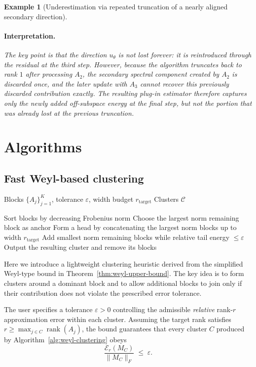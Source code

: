 \documentclass[10pt]{article} %
\newtheorem{example}{Example}
\begin{document}
\begin{example}[Underestimation via repeated truncation of a nearly aligned secondary direction]
\paragraph{Interpretation.}
The key point is that the direction $u_\theta$ is not lost forever: it is reintroduced through the residual
at the third step. However, because the algorithm truncates back to rank $1$ after processing $A_2$,
the secondary spectral component created by $A_2$ is discarded once, and the later update with $A_3$
cannot recover this previously discarded contribution exactly. The resulting plug-in estimator therefore
captures only the \emph{newly added} off-subspace energy at the final step, but not the portion that was
already lost at the previous truncation.
\end{example}


\section{Algorithms}

\subsection{Fast Weyl-based clustering}
\label{appendix:algo1}

\begin{algorithm}[t]
\caption{Weyl-based max-norm clustering}
\label{alg:weyl-clustering}
\begin{algorithmic}[1]
\REQUIRE Blocks $\{A_j\}_{j=1}^K$, tolerance $\varepsilon$, width budget $r_{\mathrm{target}}$
\ENSURE Clusters $\mathcal{C}$

\STATE Sort blocks by decreasing Frobenius norm
    \STATE Choose the largest norm remaining block as anchor
    \STATE Form a head by concatenating the largest norm blocks up to width $r_{\mathrm{target}}$
    \STATE Add smallest norm remaining blocks while relative tail energy $\le \varepsilon$
    \STATE Output the resulting cluster and remove its blocks
\ENDWHILE
\end{algorithmic}
\end{algorithm}

Here we introduce a lightweight clustering heuristic derived from the
simplified Weyl-type bound in Theorem~\ref{thm:weyl-upper-bound}. The key idea
is to form clusters around a dominant block and to allow additional blocks to
join only if their contribution does not violate the prescribed error
tolerance.

The user specifies a tolerance $\varepsilon>0$ controlling the admissible
\emph{relative} rank-$r$ approximation error within each cluster. Assuming the
target rank satisfies $r \ge \max_{j\in C}\operatorname{rank}(A_j)$, the bound
guarantees that every cluster $C$ produced by Algorithm~\ref{alg:weyl-clustering}
obeys
\[
  \frac{\mathcal{E}_r(M_C)}{\|M_C\|_F} \;\le\; \varepsilon.
\]
\end{document}
